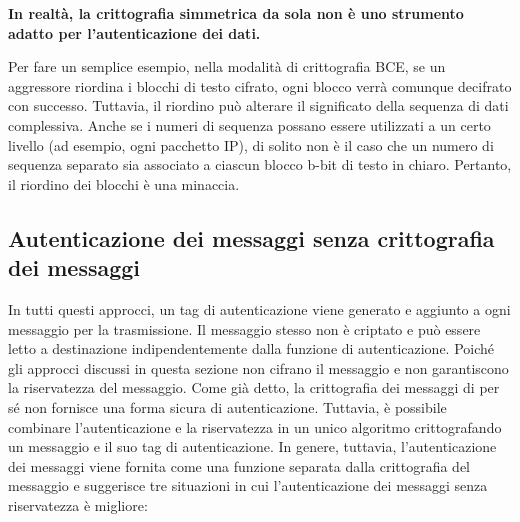 \singlespacing

\textbf{In realtà, la crittografia simmetrica da sola non è uno strumento adatto per l'autenticazione dei dati.}

\singlespacing

Per fare un semplice esempio, nella modalità di crittografia BCE, se un aggressore riordina i blocchi di testo cifrato, ogni blocco verrà comunque decifrato con successo. Tuttavia, il riordino può alterare il significato della sequenza di dati complessiva. Anche se i numeri di sequenza possano essere utilizzati a un certo livello (ad esempio, ogni pacchetto IP), di solito non è il caso che un numero di sequenza separato sia associato a ciascun blocco b-bit di testo in chiaro.
Pertanto, il riordino dei blocchi è una minaccia.

\subsection{Autenticazione dei messaggi senza crittografia dei messaggi}
In tutti questi approcci, un tag di autenticazione viene generato e aggiunto a ogni messaggio per la trasmissione. Il messaggio stesso non è criptato e può essere letto a destinazione indipendentemente dalla funzione di autenticazione. Poiché gli approcci discussi in questa sezione non cifrano il messaggio e non garantiscono la riservatezza del messaggio. Come già detto, la crittografia dei messaggi di per sé non fornisce una forma sicura di autenticazione. Tuttavia, è possibile combinare l'autenticazione e la riservatezza in un unico algoritmo crittografando un messaggio e il suo tag di autenticazione. In genere, tuttavia, l'autenticazione dei messaggi viene fornita come una funzione separata dalla crittografia del messaggio e suggerisce tre situazioni in cui l'autenticazione dei messaggi senza riservatezza è migliore:

